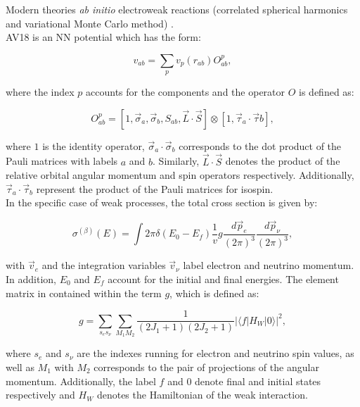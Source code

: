 \documentclass[openany]{book}
\begin{document}
Modern theories \textit{ab initio} electroweak reactions  (correlated spherical harmonics and variational Monte Carlo method) \cite{marcucci_nollett_schiavilla_wiringa_2006}. \\


AV18 is an NN potential which has the form: 

\begin{equation}\label{eq:micro_modernTheories_AV18_NN}
	v_{ab} = \sum_{p} v_p(r_{ab}) O^{p}_{ab},
\end{equation}

where the index $p$ accounts for the components and the operator $O$ is defined as:

\begin{equation}\label{eq:micro_modernTheories_AV18_O}
	O^{p}_{ab} = [1, \vec \sigma_a, \vec \sigma_b, S_{ab}, \vec L \cdot \vec S ] \otimes [1, \vec \tau_a \cdot \vec \tau b],
\end{equation}

where $1$ is the identity operator, $\vec \sigma_a \cdot \vec \sigma_b$ corresponds to the dot product of the Pauli matrices with labels $a$ and $b$. Similarly, $\vec L \cdot \vec S$ denotes the product of the relative orbital angular momentum and spin operators respectively. Additionally, $\vec \tau_a \cdot \vec \tau_b$ represent the product of the Pauli matrices for isospin.  \\

In the specific case of weak processes, the total cross section is given by:


\begin{equation}\label{eq:micro_modernTheories_weak_crossSection}
	\sigma^{(\beta)} (E) = \int {2\pi \delta (E_0 - E_f) \frac{1}{v} 	{g \frac{d\vec p_e}{(2\pi)^3} \frac{d\vec p_\nu}{(2\pi)^3} }  },
\end{equation}

with $\vec v_e$ and the integration variables $\vec v_\nu$ label electron and neutrino momentum.   In addition, $E_0$ and $E_f$ account for the initial and final energies. The element matrix in contained within the term $g$, which is defined as:

\begin{equation}\label{eq:micro_modernTheories_weak_crossSection_g}
	g = \sum_{s_e s_\nu} \sum_{M_1 M_2} {\frac{1}{(2J_1 + 1)(2J_2 + 1)}|\langle f | H_{W} |0 \rangle|^2 },
\end{equation}

where $s_e$ and $s_\nu$ are the indexes running for electron and neutrino spin values, as well as $M_1$ with $M_2$ corresponds to the pair of projections of the angular momentum. Additionally, the label $f$ and $0$ denote final and initial states respectively and $H_W$ denotes the Hamiltonian of the weak interaction. \\
\end{document}
